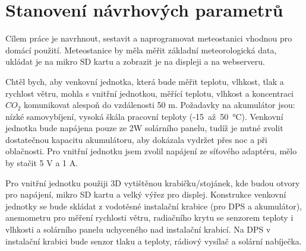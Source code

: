 \chapter{Stanovení návrhových parametrů}

    Cílem práce je navrhnout, sestavit a naprogramovat meteostanici vhodnou pro domácí použití. Meteostanice by měla měřit základní meteorologická data, ukládat je na mikro SD kartu a zobrazit je na displeji a na webserveru.
    
    Chtěl bych, aby venkovní jednotka, která bude měřit teplotu, vlhkost, tlak a rychlost větru, mohla s vnitřní jednotkou, měřící teplotu, vlhkost a koncentraci $CO_2$ komunikovat alespoň do vzdálenosti 50 m. Požadavky na akumulátor jsou: nízké samovybíjení, vysoká škála pracovní teploty (-15~až~50~°C). Venkovní jednotka bude napájena pouze ze 2W solárního panelu, tudíž je nutné zvolit dostatečnou kapacitu akumulátoru, aby dokázala vydržet přes noc a při oblačnosti. Pro vnitřní jednotku jsem zvolil napájení ze síťového adaptéru, mělo by stačit 5 V a 1 A.
    
    Pro vnitřní jednotku použiji 3D vytištěnou krabičku/stojánek, kde budou otvory pro napájení, mikro SD kartu a velký výřez pro displej. Konstrukce venkovní jednotky se bude skládat z vodotěsné instalační krabice (pro DPS a akumulátor), anemometru pro měření rychlosti větru, radiačního krytu se senzorem teploty i vlhkosti a solárního panelu uchyceného nad instalační krabicí. Na DPS v instalační krabici bude senzor tlaku a teploty, rádiový vysílač a solární nabíječka.